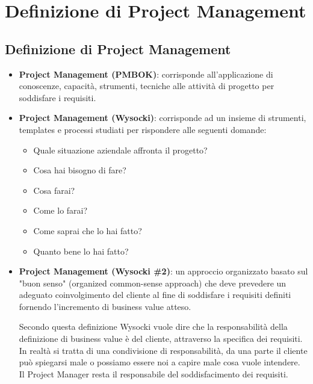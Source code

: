 \section{Definizione di Project Management}
\subsection{Definizione di Project Management}
\begin{itemize}
	\item \textbf{Project Management (PMBOK)}: corrisponde all'applicazione di conoscenze, capacità, strumenti, tecniche alle attività di progetto per soddisfare i requisiti.
	\item \textbf{Project Management (Wysocki)}: corrisponde ad un insieme di strumenti, templates e processi studiati per rispondere alle seguenti domande:
	\begin{itemize}
		\item Quale situazione aziendale affronta il progetto?
		\item Cosa hai bisogno di fare?
		\item Cosa farai?
		\item Come lo farai?
		\item Come saprai che lo hai fatto?
		\item Quanto bene lo hai fatto?
	\end{itemize}
	\item \textbf{Project Management (Wysocki \#2)}: un approccio organizzato basato sul "buon senso" (organized common-sense approach) che deve prevedere un adeguato coinvolgimento del cliente al fine di soddisfare i requisiti definiti fornendo l'incremento di business value atteso.
	\begin{info}
		Secondo questa definizione Wysocki vuole dire che la responsabilità della definizione di business value è del cliente, attraverso la specifica dei requisiti. In realtà si tratta di una condivisione di responsabilità, da una parte il cliente può spiegarsi male o possiamo essere noi a capire male cosa vuole intendere. Il Project Manager resta il responsabile del soddisfacimento dei requisiti.
	\end{info}
\end{itemize}
